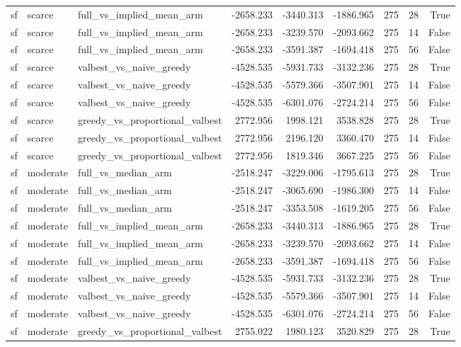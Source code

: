 \begin{tabular}{lllrrrrrr}
sf & scarce & full\_vs\_implied\_mean\_arm & -2658.233 & -3440.313 & -1886.965 & 275 & 28 & True \\
sf & scarce & full\_vs\_implied\_mean\_arm & -2658.233 & -3239.570 & -2093.662 & 275 & 14 & False \\
sf & scarce & full\_vs\_implied\_mean\_arm & -2658.233 & -3591.387 & -1694.418 & 275 & 56 & False \\
sf & scarce & valbest\_vs\_naive\_greedy & -4528.535 & -5931.733 & -3132.236 & 275 & 28 & True \\
sf & scarce & valbest\_vs\_naive\_greedy & -4528.535 & -5579.366 & -3507.901 & 275 & 14 & False \\
sf & scarce & valbest\_vs\_naive\_greedy & -4528.535 & -6301.076 & -2724.214 & 275 & 56 & False \\
sf & scarce & greedy\_vs\_proportional\_valbest & 2772.956 & 1998.121 & 3538.828 & 275 & 28 & True \\
sf & scarce & greedy\_vs\_proportional\_valbest & 2772.956 & 2196.120 & 3360.470 & 275 & 14 & False \\
sf & scarce & greedy\_vs\_proportional\_valbest & 2772.956 & 1819.346 & 3667.225 & 275 & 56 & False \\
sf & moderate & full\_vs\_median\_arm & -2518.247 & -3229.006 & -1795.613 & 275 & 28 & True \\
sf & moderate & full\_vs\_median\_arm & -2518.247 & -3065.690 & -1986.300 & 275 & 14 & False \\
sf & moderate & full\_vs\_median\_arm & -2518.247 & -3353.508 & -1619.205 & 275 & 56 & False \\
sf & moderate & full\_vs\_implied\_mean\_arm & -2658.233 & -3440.313 & -1886.965 & 275 & 28 & True \\
sf & moderate & full\_vs\_implied\_mean\_arm & -2658.233 & -3239.570 & -2093.662 & 275 & 14 & False \\
sf & moderate & full\_vs\_implied\_mean\_arm & -2658.233 & -3591.387 & -1694.418 & 275 & 56 & False \\
sf & moderate & valbest\_vs\_naive\_greedy & -4528.535 & -5931.733 & -3132.236 & 275 & 28 & True \\
sf & moderate & valbest\_vs\_naive\_greedy & -4528.535 & -5579.366 & -3507.901 & 275 & 14 & False \\
sf & moderate & valbest\_vs\_naive\_greedy & -4528.535 & -6301.076 & -2724.214 & 275 & 56 & False \\
sf & moderate & greedy\_vs\_proportional\_valbest & 2755.022 & 1980.123 & 3520.829 & 275 & 28 & True \\

\end{tabular}
